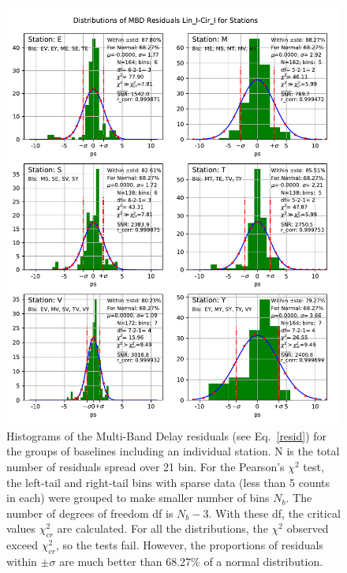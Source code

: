 \documentclass[letterpaper,twoside,12pt]{article}
\begin{document}
\begin{figure}[ht!]
  \begin{center}
  \includegraphics[width=33pc]{Distr_MBD_Lin_I-Cir_I_Diff_Stations.pdf}
  \caption{\small Histograms of the Multi-Band Delay residuals (see Eq.~\eqref{resid}) for the groups of baselines including an individual station. N is the total number of residuals spread over 21 bin. For the Pearson's $\chi^2$ test, the left-tail and right-tail bins with sparse data (less than 5 counts in each) were grouped to make smaller number of bins $N_b$. The number of degrees of freedom df is $N_b-3$. With these df, the critical values $\chi^2_{cr}$ are calculated. For all the distributions, the $\chi^2$ observed exceed $\chi^2_{cr}$, so the tests fail. However, the proportions of residuals within $\pm\sigma$ are much better than 68.27\% of a normal distribution.}
  \label{dmbd_distr_st}
  \end{center}
\end{figure}
\end{document}
